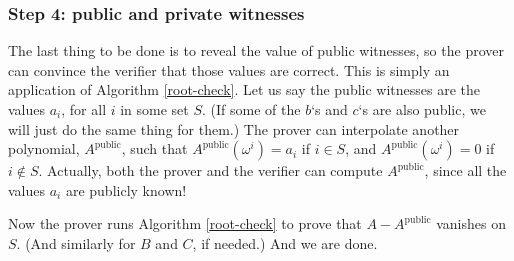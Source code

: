 \subsubsection{Step 4: public and private witnesses}

The last thing to be done is to reveal the value of public witnesses, so
the prover can convince the verifier that those values are correct. This
is simply an application of Algorithm \ref{root-check}. Let us say the public
witnesses are the values \(a_{i}\), for all \(i\) in some set \(S\). (If
some of the \(b\)`s and \(c\)`s are also public, we will just do the
same thing for them.) The prover can interpolate another polynomial,
\(A^{\text{public}}\), such that
\(A^{\text{public}}\left( \omega^{i} \right) = a_{i}\) if \(i \in S\),
and \(A^{\text{public}}\left( \omega^{i} \right) = 0\) if
\(i \notin S\). Actually, both the prover and the verifier can compute
\(A^{\text{public}}\), since all the values \(a_{i}\) are publicly
known!

Now the prover runs Algorithm \ref{root-check} to prove that
\(A - A^{\text{public}}\) vanishes on \(S\). (And similarly for \(B\)
and \(C\), if needed.) And we are done.
